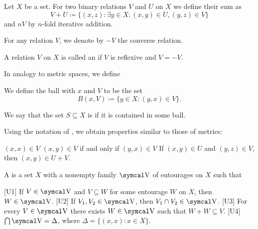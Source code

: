 \begin{definition}\label{def:entourage}\cite[section 8.1]{Engelking1989}
  Let \( X \) be a set. For two binary relations \( V \) and \( U \) on \( X \) we define their sum as
  \begin{equation*}
    V + U \coloneqq \{ (x, z) \colon \exists y \in X: (x, y) \in U, (y, z) \in V \}
  \end{equation*}
  and \( nV \) by \( n \)-fold iterative addition.

  For any relation \( V \), we denote by \( -V \) the converse relation.

  A relation \( V \) on \( X \) is called an  if \( V \) is reflexive and \( V = -V \).

  In analogy to metric spaces, we define
  \begin{defenum}
     We define the ball with  \( x \) and  \( V \) to be the set
    \begin{equation*}
      B(x, V) \coloneqq \{ y \in X \colon (y, x) \in V \}.
    \end{equation*}

     We say that the set \( S \subseteq X \) is  if it is contained in some ball.
  \end{defenum}
\end{definition}

\begin{proposition}\label{thm:entourage_simulates_metric}\cite[section 8.1]{Engelking1989}
  Using the notation of , we obtain properties similar to those of metrics:
  \begin{description}
     \( (x, x) \in V \)
     \( (x, y) \in V \) if and only if \( (y, x) \in V \)
     If \( (x, y) \in U \) and \( (y, z) \in V \), then \( (x, y) \in U + V \).
  \end{description}
\end{proposition}

\begin{definition}\label{def:uniform_space}\cite[section 8.1]{Engelking1989}
  A  is a set \( X \) with a nonempty family \( \CV \) of entourages on \( X \) such that
  \begin{defenum}
    [U1] If \( V \in \CV \) and \( V \subseteq W \) for some entourage \( W \) on \( X \), then \( W \in \CV \).
    [U2] If \( V_1, V_2 \in \CV \), then \( V_1 \cap V_2 \in \CV \).
    [U3] For every \( V \in \CV \) there exists \( W \in \CV \) such that \( W + W \subseteq V \).
    [U4] \( \bigcap \CV = \Delta \), where \( \Delta = \{ (x, x) \colon x \in X \} \).
  \end{defenum}
\end{definition}


